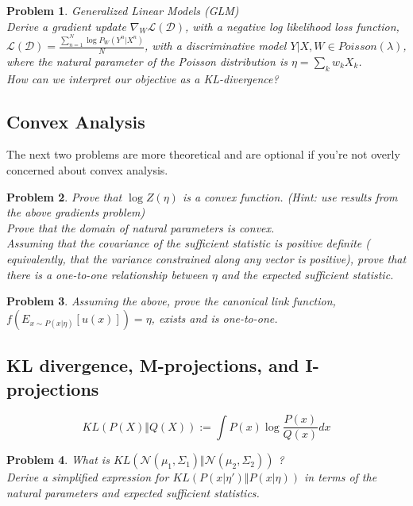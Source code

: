 \documentclass[a4paper]{article}
\newtheorem{problem}{Problem}[section]
\begin{document}
\begin{problem} Generalized Linear Models (GLM) \\
  Derive a gradient update $\nabla_W \mathcal{L}\left( \mathcal{D} \right)$, with a negative log likelihood loss function, $\mathcal{L}(\mathcal{D}) = \frac{\sum_{n=1}^N \log P_W(Y^n \vert X^n) }{N}$, with a discriminative model $ Y \vert X, W \in Poisson(\lambda) $, where the natural parameter of the Poisson distribution is $\eta = \sum_k w_k X_k$. \\
  How can we interpret our objective as a KL-divergence?
\end{problem}

\subsection{Convex Analysis}

The next two problems are more theoretical and are optional if you're not overly concerned about convex analysis.
\begin{problem}
Prove that $ \log Z(\eta)$ is a convex function. 
(Hint: use results from the above gradients problem)  \\
Prove that the domain of natural parameters is convex.  \\
Assuming that the covariance of the sufficient statistic is positive definite ( equivalently, that the variance constrained along any vector is positive), prove that there is a one-to-one relationship between $\eta$ and the expected sufficient statistic.
\end{problem}

\begin{problem}
Assuming the above, prove the canonical link function, $f( E_{ x \sim P( x \vert \eta) } [ u(x) ] ) = \eta $, exists and is one-to-one.
\end{problem}

\subsection{KL divergence, M-projections, and I-projections}

\begin{equation}
  KL \left( P(X) \Vert Q(X) \right) := \int P(x) \log \frac{P(x)}{Q(x)} dx
  \label{KL}
\end{equation}

\begin{problem}
What is $ KL\left( \mathcal{N} \left( \mu_1,\Sigma_1 \right) \Vert \mathcal{N} \left( \mu_2, \Sigma_2 \right) \right) $ ? \\
Derive a simplified expression for $ KL\left( P( x \vert \eta') \Vert P( x \vert \eta) \right)$ in terms of the natural parameters and expected sufficient statistics.  \\
\end{problem}
\end{document}
